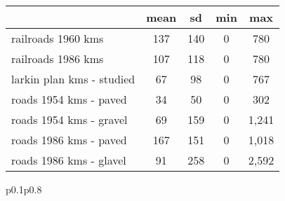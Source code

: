 {
\begin{tabular}{lcccc}}{p{0.1\textwidth}p{0.8\textwidth}}
                    &        mean&          sd&         min&         max\\
\hline
railroads 1960 kms  &         137&         140&           0&         780\\
railroads 1986 kms  &         107&         118&           0&         780\\
larkin plan kms - studied&          67&          98&           0&         767\\
roads 1954 kms - paved&          34&          50&           0&         302\\
roads 1954 kms - gravel&          69&         159&           0&       1,241\\
roads 1986 kms - paved&         167&         151&           0&       1,018\\
roads 1986 kms - glavel&          91&         258&           0&       2,592\\
\end{tabular}{p{0.1\textwidth}p{0.8\textwidth}}
}
